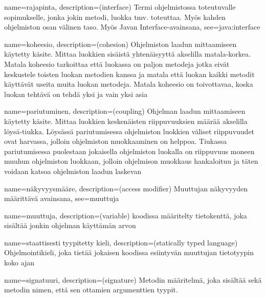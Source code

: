 {
    name=rajapinta,
    description={(interface) Termi ohjelmistossa toteutuvalle sopimukselle,
jonka jokin metodi, luokka tmv. toteuttaa. Myös kahden ohjelmiston osan välinen
taso. Myös Javan Interface-avainsana},
    see={java:interface}
}

{
    name=koheesio,
    description={(cohesion) Ohjelmiston laadun mittaamiseen käytetty käsite.
Mittaa luokkien sisäistä yhtenäisyyttä akselilla matala-korkea. Matala koheesio
tarkoittaa että luokassa on paljon metodeja jotka eivät keskustele toisten
luokan metodien kanssa ja matala että luokan kaikki metodit käyttävät useita
muita luokan metodeja. Matala koheesio on toivottavaa, koska luokan tehtävä
on tehdä yksi ja vain yksi asia}
}

{
    name=pariutuminen,
    description={(coupling) Ohjelman laadun mittaamiseen käytetty käsite.
Mittaa luokkien keskenäisten riippuvuuksien määrää akselilla löysä-tiukka.
Löysässä pariutumisessa ohjelmiston luokkien väliset riippuvuudet ovat
harvassa, jolloin ohjelmiston muokkaaminen on helppoa. Tiukassa pariutumisessa
puolestaan jokaisella ohjelmiston luokalla on riippuvuus moneen muuhun
ohjelmiston luokkaan, jolloin ohjelmison muokkaus hankaloituu ja täten voidaan
katsoa ohjelmiston laadun laskevan}
}


{
    name=näkyvyysmääre,
    description={(access modifier) Muuttujan näkyvyyden määrittävä avainsana},
    see={muuttuja}
}

{
    name=muuttuja,
    description={(variable) koodissa määritelty tietokenttä, joka sisältää jonkin ohjelman
käyttämän arvon}
}

{
    name=staattisesti tyypitetty kieli,
    description={(statically typed language) Ohjelmointikieli, joka tietää jokaisen koodissa
esiintyvän muuttujan tietotyypin koko ajan}
}

{
	name=signatuuri,
	description={(signature) Metodin määritelmä, joka sisältää sekä metodin nimen, että sen
ottamien argumenttien tyypit.}
}